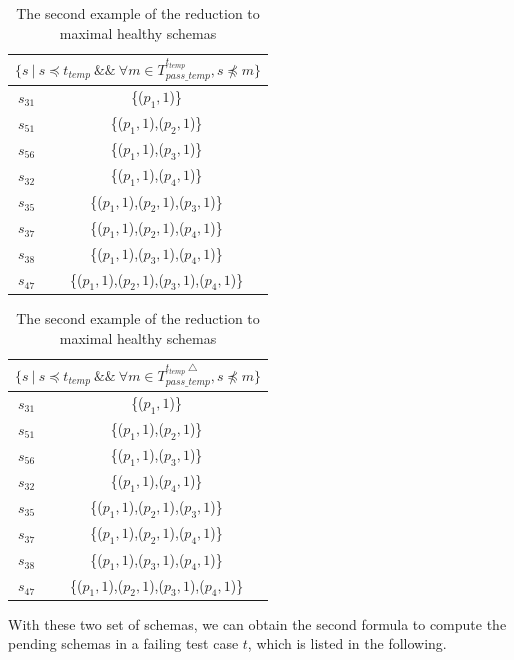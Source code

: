  \begin{table}[htbp]
  \centering
  \caption{The second example of the reduction to maximal healthy schemas}
  \label{ex:maximalhealthyintequal2}
    \begin{tabular}{|c|c|} \hline
     \multicolumn{2}{|c|}{$\{ s\ |\ s \preceq t_{temp}\ \&\&\ \forall m \in T_{pass\_temp}^{t_{temp}}, s \npreceq m \} $} \\ \hline
   $s_{31}$ & \{($p_{1}, 1$)\} \\
   $s_{51}$ & \{($p_{1}, 1$),($p_{2}, 1$)\} \\
   $s_{56}$ & \{($p_{1}, 1$),($p_{3}, 1$)\} \\
   $s_{32}$ & \{($p_{1}, 1$),($p_{4}, 1$)\} \\

   $s_{35}$ & \{($p_{1}, 1$),($p_{2}, 1$),($p_{3}, 1$)\} \\
   $s_{37}$ & \{($p_{1}, 1$),($p_{2}, 1$),($p_{4}, 1$)\} \\
   $s_{38}$ & \{($p_{1}, 1$),($p_{3}, 1$),($p_{4}, 1$)\} \\

   $s_{47}$ & \{($p_{1}, 1$),($p_{2}, 1$),($p_{3}, 1$),($p_{4}, 1$)\} \\ \hline
    \end{tabular}%
\quad
    \begin{tabular}{|c|c|} \hline
   \multicolumn{2}{|c|}{$\{ s\ |\ s \preceq t_{temp}\ \&\&\ \forall m \in T_{pass\_temp}^{t_{temp}\bigtriangleup}, s \npreceq m \}$}\\ \hline
   $s_{31}$ & \{($p_{1}, 1$)\} \\
   $s_{51}$ & \{($p_{1}, 1$),($p_{2}, 1$)\} \\
   $s_{56}$ & \{($p_{1}, 1$),($p_{3}, 1$)\} \\
   $s_{32}$ & \{($p_{1}, 1$),($p_{4}, 1$)\} \\

   $s_{35}$ & \{($p_{1}, 1$),($p_{2}, 1$),($p_{3}, 1$)\} \\
   $s_{37}$ & \{($p_{1}, 1$),($p_{2}, 1$),($p_{4}, 1$)\} \\
   $s_{38}$ & \{($p_{1}, 1$),($p_{3}, 1$),($p_{4}, 1$)\} \\

   $s_{47}$ & \{($p_{1}, 1$),($p_{2}, 1$),($p_{3}, 1$),($p_{4}, 1$)\} \\ \hline
    \end{tabular}%
\end{table}


With these two set of schemas, we can obtain the second formula to compute the pending schemas in a failing test case $t$, which is listed in the following.

